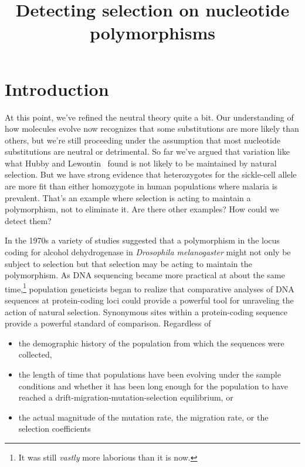 \documentclass[12pt]{article}
\title{Detecting selection on nucleotide polymorphisms}
\begin{document}
\maketitle

\thispagestyle{first}

\section*{Introduction}

At this point, we've refined the neutral theory quite a bit. Our
understanding of how molecules evolve now recognizes that some
substitutions are more likely than others, but we're still proceeding
under the assumption that most nucleotide substitutions are neutral or
detrimental. So far we've argued that variation like what Hubby and
Lewontin~\cite{Hubby-Lewontin66,Lewontin-Hubby66} found is not likely
to be maintained by natural selection. But we have strong evidence
that heterozygotes for the sickle-cell allele are more fit than either
homozygote in human populations where malaria is prevalent. That's an
example where selection is acting to maintain a polymorphism, not to
eliminate it. Are there other examples? How could we detect them?

In the 1970s a variety of studies suggested that a polymorphism in the
locus coding for alcohol dehydrogenase in {\it Drosophila
  melanogaster\/} might not only be subject to selection but that
selection may be acting to maintain the polymorphism. As DNA
sequencing became more practical at about the same time,\footnote{It
  was still {\it vastly\/} more laborious than it is now.} population
geneticists began to realize that comparative analyses of DNA
sequences at protein-coding loci could provide a powerful tool for
unraveling the action of natural selection. Synonymous sites within a
protein-coding sequence provide a powerful standard of
comparison. Regardless of

\begin{itemize}

\item the demographic history of the population from which the
  sequences were collected,

\item the length of time that populations have been evolving under the
  sample conditions and whether it has been long enough for the
  population to have reached a drift-migration-mutation-selection
  equilibrium, or

\item the actual magnitude of the mutation rate, the migration rate,
  or the selection coefficients

\end{itemize}
\end{document}
